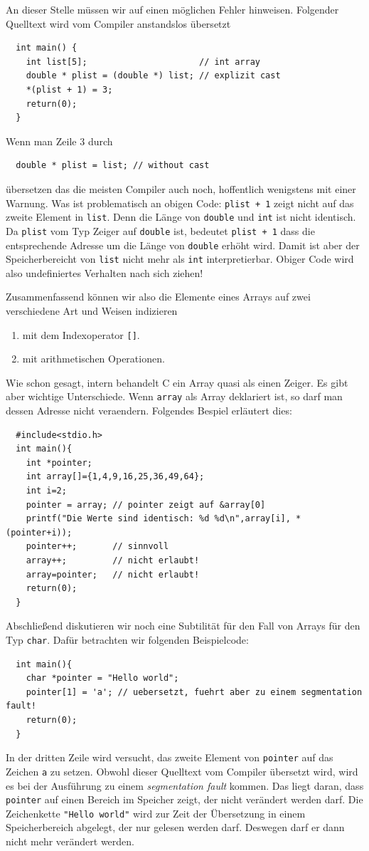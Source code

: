An dieser Stelle müssen wir auf einen möglichen Fehler hinweisen.
Folgender Quelltext wird vom Compiler anstandslos übersetzt
\begin{lstlisting}
  int main() {
    int list[5];                      // int array
    double * plist = (double *) list; // explizit cast
    *(plist + 1) = 3;
    return(0);
  }
\end{lstlisting}
Wenn man Zeile $3$ durch
\begin{lstlisting}
  double * plist = list; // without cast
\end{lstlisting}
übersetzen das die meisten Compiler auch noch, hoffentlich wenigstens mit einer Warnung.
Was ist problematisch an obigen Code:
\verb|plist + 1| zeigt nicht auf das zweite Element in \verb|list|.
Denn die Länge von \verb|double| und \verb|int| ist nicht identisch.
Da \verb|plist| vom Typ Zeiger auf \verb|double| ist, bedeutet \verb|plist + 1| dass die entsprechende Adresse um die Länge von \verb|double| erhöht wird.
Damit ist aber der Speicherbereicht von \verb|list| nicht mehr als \verb|int| interpretierbar.
Obiger Code wird also undefiniertes Verhalten nach sich ziehen!

Zusammenfassend können wir also die Elemente eines Arrays auf zwei verschiedene Art und Weisen indizieren
\begin{enumerate}
\item mit dem Indexoperator \verb|[]|.
\item mit arithmetischen Operationen.
\end{enumerate}
Wie schon gesagt, intern behandelt C ein Array quasi als einen Zeiger.
Es gibt aber wichtige Unterschiede.
Wenn \verb|array| als Array deklariert ist, so darf man dessen Adresse nicht veraendern.
Folgendes Bespiel erläutert dies:
\begin{lstlisting}
  #include<stdio.h>
  int main(){
    int *pointer;
    int array[]={1,4,9,16,25,36,49,64};
    int i=2;
    pointer = array; // pointer zeigt auf &array[0]
    printf("Die Werte sind identisch: %d %d\n",array[i], *(pointer+i));
    pointer++;       // sinnvoll
    array++;         // nicht erlaubt!
    array=pointer;   // nicht erlaubt!
    return(0);
  }
\end{lstlisting}
Abschließend diskutieren wir noch eine Subtilität für den Fall von Arrays für den Typ \verb|char|.
Dafür betrachten wir folgenden Beispielcode:
\begin{lstlisting}
  int main(){
    char *pointer = "Hello world";
    pointer[1] = 'a'; // uebersetzt, fuehrt aber zu einem segmentation fault!
    return(0);
  }
\end{lstlisting}
In der dritten Zeile wird versucht, das zweite Element von \verb|pointer| auf das Zeichen \verb|a| zu setzen.
Obwohl dieser Quelltext vom Compiler übersetzt wird, wird es bei der Ausführung zu einem \emph{segmentation fault} kommen.
Das liegt daran, dass \verb|pointer| auf einen Bereich im Speicher zeigt, der nicht verändert werden darf.
Die Zeichenkette \verb|"Hello world"| wird zur Zeit der Übersetzung in einem Speicherbereich abgelegt, der nur gelesen werden darf.
Deswegen darf er dann nicht mehr verändert werden.

\endinput
